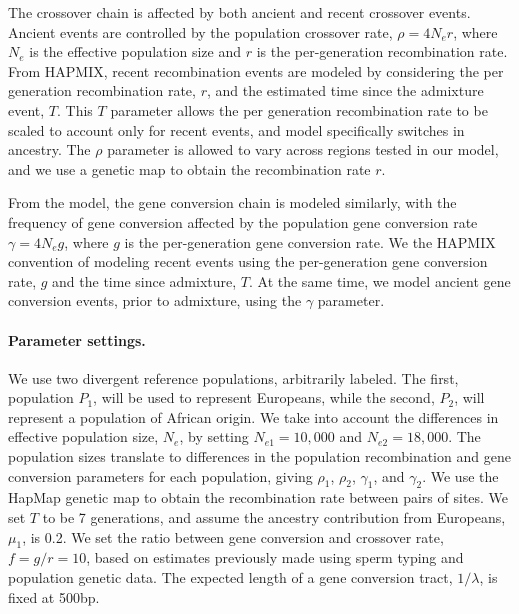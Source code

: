 The crossover chain is affected by both ancient and recent crossover events.
Ancient events are controlled by the population crossover rate, $\rho = 4 N_e r$, where $N_e$ is the effective population size and $r$ is the per-generation recombination rate.
From HAPMIX, recent recombination events are modeled by considering the per generation recombination rate, $r$, and the estimated time since the admixture event, $T$.
This $T$ parameter allows the per generation recombination rate to be scaled to account only for recent events, and model specifically switches in ancestry.
The $\rho$ parameter is allowed to vary across regions tested in our model, and we use a genetic map to obtain the recombination rate $r$.

From the \citet{Gay2007} model, the gene conversion chain is modeled similarly, with the frequency of gene conversion affected by the population gene conversion rate $\gamma = 4 N_e g$, where $g$ is the per-generation gene conversion rate.
We the HAPMIX convention of modeling recent events using the per-generation gene conversion rate, $g$ and the time since admixture, $T$.
At the same time, we model ancient gene conversion events, prior to admixture, using the $\gamma$ parameter.


\paragraph*{Parameter settings.}
We use two divergent reference populations, arbitrarily labeled.
The first, population $P_1$, will be used to represent Europeans, while the second, $P_2$, will represent a population of African origin.
We take into account the differences in effective population size, $N_e$, by setting $N_{e1} = 10,000$ and $N_{e2} = 18,000$.
The population sizes translate to differences in the population recombination and gene conversion parameters for each population, giving $\rho_1$, $\rho_2$, $\gamma_1$, and $\gamma_2$.
We use the HapMap genetic map\cite{hapmap2007} to obtain the recombination rate between pairs of sites.
We set $T$ to be 7 generations, and assume the ancestry contribution from Europeans, $\mu_1$, is 0.2.
We set the ratio between gene conversion and crossover rate, $f = g / r = 10$, based on estimates previously made using sperm typing\cite{Jeffreys2004} and population genetic\cite{Gay2007} data.
The expected length of a gene conversion tract, $1/\lambda$, is fixed at 500bp.

